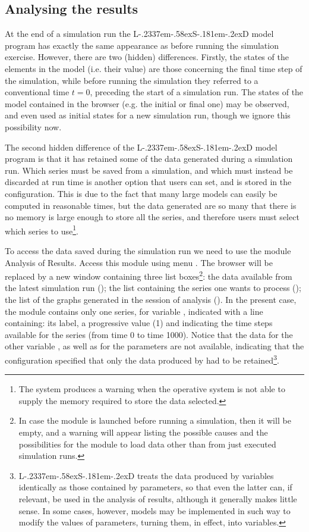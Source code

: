 \documentclass [11pt,a4paper] {book}
\def\LsD{{L\kern-.2337em\lower-.58ex\hbox{S}\kern-.181em\lower-.2ex\hbox{D}}\xspace}
\begin{document}
\subsection{Analysing the results}

At the end of a simulation run the \LsD model program has exactly the same appearance as before running the simulation exercise. However, there are two (hidden) differences. Firstly, the states of the elements in the model (i.e. their value) are those concerning the final time step of the simulation, while before running the simulation they referred to a conventional time $t=0$, preceding the start of a simulation run. The states of the model contained in the browser (e.g. the initial or final one) may be observed, and even used as initial states for a new simulation run, though we ignore this possibility now. 

The second hidden difference of the \LsD model program is that it has retained some of the data generated during a simulation run. Which series must be saved from a simulation, and which must instead be discarded at run time is another option that users can set, and is stored in the configuration. This is due to the fact that many large models can easily be computed in reasonable times, but the data generated are so many that there is no memory is large enough to store all the series, and therefore users must select which series to use\footnote{The system produces a warning when the operative system is not able to supply the memory required to store the data selected.}. 

To access the data saved during the simulation run we need to use the module Analysis of Results. Access this module using menu . The browser will be replaced by a new window containing three list boxes\footnote{In case the module is launched before running a simulation, then it will be empty, and a warning will appear listing the possible causes and the possibilities for the module to load data other than from just executed simulation runs.}: the data available from the latest simulation run (); the list containing the series one wants to process (); the list of the graphs generated in the session of analysis (). In the present case, the module contains only one series, for variable , indicated with a line containing: its label, a progressive value (1) and indicating the time steps available for the series (from time 0 to time 1000). Notice that the data for the other variable , as well as for the parameters are not available, indicating that the configuration specified that only the data produced by  had to be retained\footnote{\LsD treats the data produced by variables identically as those contained by parameters, so that even the latter can, if relevant, be used in the analysis of results, although it generally makes little sense. In some cases, however, models may be implemented in such way to modify the values of parameters, turning them, in effect, into variables.}.
\end{document}
